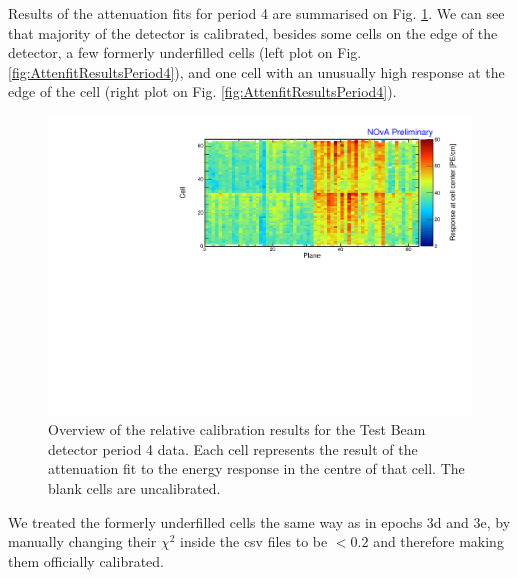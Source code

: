 Results of the attenuation fits for period 4 are summarised on Fig. \ref{fig:CellCentreResponsePeriod4}. We can see that majority of the detector is calibrated, besides some cells on the edge of the detector, a few formerly underfilled cells (left plot on Fig. \ref{fig:AttenfitResultsPeriod4}), and one cell with an unusually high response at the edge of the cell (right plot on Fig. \ref{fig:AttenfitResultsPeriod4}).

\begin{figure}[!hbtp]
\centering
\includegraphics[width=\textwidth]{PlotsTBCalibTechnote/CellResponseAtCentre_period4_Limited_NOvAPlotStyle.pdf}
\caption{Overview of the relative calibration results for the Test Beam detector period 4 data. Each cell represents the result of the attenuation fit to the energy response in the centre of that cell. The blank cells are uncalibrated.}
\label{fig:CellCentreResponsePeriod4}
\end{figure}

We treated the formerly underfilled cells the same way as in epochs 3d and 3e, by manually changing their $\chi^2$ inside the csv files to be $<0.2$ and therefore making them officially calibrated.

